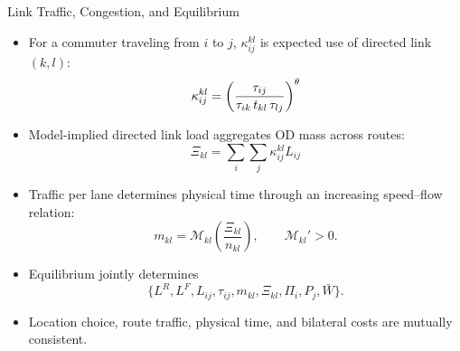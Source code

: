 \documentclass[11pt,aspectratio=169]{beamer}
\newcommand{\app}[1]{\allowbreak\hspace{0.25em}\hyperlink{#1}{\beamergotobutton{details}}}
\begin{document}
\begin{frame}[label=equilibrium]{Link Traffic, Congestion, and Equilibrium}
\begin{itemize}\footnotesize
  \item For a commuter traveling from $i$ to $j$, $\kappa^{kl}_{ij}$ is expected use of directed link $(k,l)$:
  \vspace{-0.85em}\begin{equation}
    \kappa^{kl}_{ij} = \left( \frac{\tau_{ij}} {\tau_{ik}\,t_{kl}\,\tau_{lj}} \right)^\theta
  \vspace{-0.65em}\end{equation}
  \item Model-implied directed link load aggregates OD mass across routes:
  \vspace{-0.55em}
  \begin{equation}\label{eq:Xi_c}
  \Xi_{kl} = \sum_i\sum_j \kappa^{kl}_{ij}L_{ij}
  \end{equation}
  \vspace{-0.75em}
  \item Traffic per lane determines physical time through an increasing speed--flow relation:
  \vspace{-0.55em}\begin{equation}\label{eq:c_Xi}
    m_{kl}=\mathcal M_{kl}\!\left(\frac{\Xi_{kl}}{n_{kl}}\right),
    \qquad \mathcal M_{kl}'>0.
  \end{equation}
  \vspace{-0.75em}
  \item Equilibrium jointly determines
  \vspace{-0.45em}\begin{equation}
    \{L^R,L^F,L_{ij},\tau_{ij},m_{kl},\Xi_{kl},\Pi_i,P_j,\bar W\}.
  \end{equation}
  \vspace{-0.75em}
  \item Location choice, route traffic, physical time, and bilateral costs are mutually consistent. \app{appexist}
\end{itemize}
\end{frame}
\end{document}
